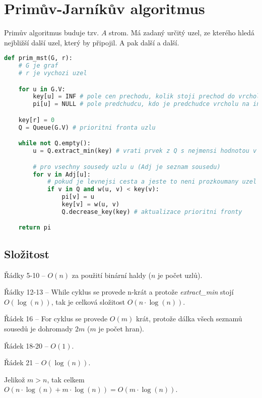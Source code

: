 
\section{Primův-Jarníkův algoritmus}

Primův algoritmus buduje tzv. $A$ strom. Má zadaný určitý uzel, ze kterého hledá nejbližší další uzel, který by připojil. A pak další a další.

\bigskip\noindent\begin{minipage}{\linewidth}
\begin{lstlisting}[language=Python, caption={Primův algoritmus.}]
def prim_mst(G, r):
    # G je graf
    # r je vychozi uzel

    for u in G.V:
        key[u] = INF # pole cen prechodu, kolik stoji prechod do vrcholu na indexu
        pi[u] = NULL # pole predchudcu, kdo je predchudce vrcholu na indexu

    key[r] = 0
    Q = Queue(G.V) # prioritni fronta uzlu

    while not Q.empty():
        u = Q.extract_min(key) # vrati prvek z Q s nejmensi hodnotou v key

        # pro vsechny sousedy uzlu u (Adj je seznam sousedu)
        for v in Adj[u]:
            # pokud je levnejsi cesta a jeste to neni prozkoumany uzel
            if v in Q and w(u, v) < key(v):
                pi[v] = u
                key[v] = w(u, v)
                Q.decrease_key(key) # aktualizace prioritni fronty

    return pi
\end{lstlisting}
\end{minipage}

\subsection*{Složitost}

\begin{compactitem}
    \item Řádky 5-10 -- $O(n)$ za použití binární haldy ($n$ je počet uzlů).
    \item Řádky 12-13 -- While cyklus se provede n-krát a protože \textit{extract\_min} stojí $O(\log(n))$, tak je celková složitost $O(n \cdot \log(n))$.
    \item Řádek 16 -- For cyklus se provede $O(m)$ krát, protože dálka všech seznamů sousedů je dohromady $2m$ ($m$ je počet hran).
    \item Řádek 18-20 -- $O(1)$.
    \item Řádek 21 -- $O(\log(n))$.
    \item Jelikož $m > n$, tak celkem $O(n \cdot \log(n) + m \cdot \log(n)) = O(m \cdot \log(n))$.
\end{compactitem}

